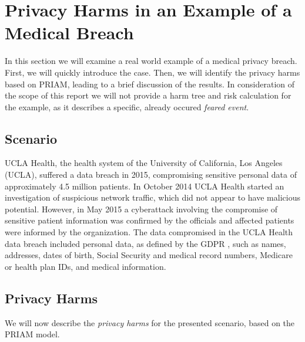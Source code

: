 \section{Privacy Harms in an Example of a Medical Breach}
In this section we will examine a real world example of a medical privacy breach. First, we will quickly introduce the case. Then, we will identify the privacy harms based on PRIAM, leading to a brief discussion of the results.  In consideration of the scope of this report we will not provide a harm tree and risk calculation for the example, as it describes a specific, already occured \textit{feared event}.

\subsection{Scenario}
UCLA Health, the health system of the University of California, Los Angeles (UCLA), suffered a data breach in 2015, compromising sensitive personal data of approximately 4.5 million patients. In October 2014 UCLA Health started an investigation of suspicious network traffic, which did not appear to have malicious potential. However, in May 2015 a cyberattack involving the compromise of sensitive patient information was confirmed by the officials and affected patients were informed by the organization. The data compromised in the UCLA Health data breach included personal data, as defined by the GDPR \cite[Article 4(1)]{gdpr}, such as names, addresses, dates of birth, Social Security and medical record numbers, Medicare or health plan IDs, and medical information.\cite{uclahealthbreach}

\subsection{Privacy Harms}
We will now describe the \textit{privacy harms} for the presented scenario, based on the PRIAM model\cite[Section 3.7]{de:hal-01302541}.

